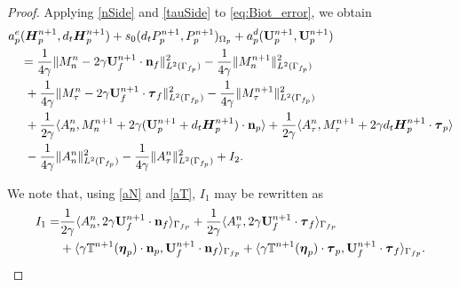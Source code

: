 \documentclass[11pt]{article}
\def\n{{\bf n}}
\def\btau{\boldsymbol{\tau}}
\def\bbeta{\boldsymbol{\eta}}
\def\U{{\bf U}}
\def\E{\boldsymbol{H}}
\def\O{\Omega}
\def\<{\langle}
\def\>{\rangle}
\def\ddt{d_t}
\begin{document}
\begin{proof}
%
Applying \eqref{nSide} and \eqref{tauSide} to \eqref{eq:Biot_error}, we obtain
%
\begin{alignat}{1}
  &
   a_p^e(\E_p^{n+1}, \ddt \E_p^{n+1})
  + s_0(\ddt P_p^{n+1}, P_p^{n+1})_{\O_p}
  + a_p^d (\U_p^{n+1}, \U_p^{n+1})
  \nonumber\\
& \quad = \frac{1}{4\gamma}\|M_n^n - 2\gamma \U_f^{n+1}\cdot \n_f\|_{L^2(\Gamma_{f_p})}^2 - \frac{1}{4\gamma} \|M_n^{n+1}\|_{L^2(\Gamma_{f_p})}^2 \nonumber \\
&\quad \ + \frac{1}{4\gamma}\|M_\tau^n - 2\gamma \U_f^{n+1} \cdot \btau_f\|_{L^2(\Gamma_{f_p})}^2 - \frac{1}{4\gamma} \|M_\tau^{n+1}\|_{L^2(\Gamma_{f_p})}^2 \nonumber \\
&\quad \ + \frac{1}{2\gamma}\<A_n^n, M_n^{n+1} + 2\gamma (\U_p^{n+1} + \ddt \E_p^{n+1})\cdot \n_p\>+ \frac{1}{2\gamma}\<A_\tau^n,M_\tau^{n+1} + 2\gamma \ddt \E_p^{n+1}\cdot \btau_p\>\nonumber \\
 &\quad \ - \frac{1}{4\gamma}\|A_n^n\|_{L^2(\Gamma_{f_p})}^2   -\frac{1}{4\gamma} \|A_\tau^n\|_{L^2(\Gamma_{f_p})}^2+ I_2. \label{boundBIOT}
\end{alignat}

We note that, using \eqref{aN} and \eqref{aT}, $I_1$ may be rewritten as
%
\begin{alignat*}{1}
I_1 =& \frac{1}{2\gamma}\<A_n^n, 2\gamma \U_f^{n+1} \cdot \n_f\>_{\Gamma_{fp}}+ \frac{1}{2\gamma}\<A_\tau^n, 2\gamma \U_f^{n+1}\cdot \btau_f\>_{\Gamma_{fp}} \\
& + \<\gamma \mathbb{T}^{n+1}(\bbeta_p)\cdot\n_p, \U_f^{n+1}\cdot \n_f\>_{\Gamma_{fp}}+ \<\gamma \mathbb{T}^{n+1}(\bbeta_p)\cdot \btau_p,\U_f^{n+1}\cdot \btau_f\>_{\Gamma_{fp}}.
\end{alignat*}
%


\end{proof}
\end{document}
